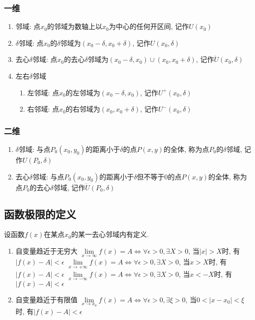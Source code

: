 \subsubsection{一维}
\begin{enumerate}
    \item 邻域: 点$ x_{0} $的邻域为数轴上以$ x_{0} $为中心的任何开区间, 记作$ U(x_{0}) $
    \item $ \delta $邻域: 点$ x_{0} $的$ \delta $邻域为$ (x_{0}-\delta,x_{0}+\delta) $, 记作$ U(x_{0},\delta) $
    \item 去心$ \delta $邻域: 点$ x_{0} $的去心$ \delta $邻域为$ (x_{0}-\delta,x_{0})\cup (x_{0},x_{0}+\delta) $, 记作$ \mathring{U}(x_{0},\delta) $
    \item 左右$ \delta $邻域
          \begin{enumerate}
              \item 左邻域: 点$ x_{0} $的左邻域为$ (x_{0}-\delta,x_{0}) $, 记作$ U^{+}(x_{0},\delta) $
              \item 右邻域: 点$ x_{0} $的右邻域为$ (x_{0},x_{0}+\delta) $, 记作$ U^{-}(x_{0},\delta) $
          \end{enumerate}
\end{enumerate}
\subsubsection{二维}
\begin{enumerate}
    \item $ \delta $邻域: 与点$ P_{0}(x_{0},y_{0}) $的距离小于$ \delta $的点$ P(x,y) $的全体, 称为点$ P_{0} $的$ \delta $邻域, 记作$ U(P_{0},\delta) $
    \item 去心$ \delta $邻域: 与点$ P_{0}(x_{0},y_{0}) $的距离小于$ \delta $但不等于0的点$ P(x,y) $的全体, 称为点$ P_{0} $的去心$ \delta $邻域, 记作$ \mathring{U}(P_{0},\delta) $
\end{enumerate}
\subsection{函数极限的定义}
设函数$ f(x) $在某点$ x_{0} $的某一去心邻域内有定义.
\begin{enumerate}
    \item 自变量趋近于无穷大
          \subitem $ \lim\limits_{x\rightarrow \infty}f(x)=A\Leftrightarrow \forall \epsilon >0, \exists X>0 $, 当$ |x|>X $时, 有$ |f(x)-A|<\epsilon $
          \subitem $ \lim\limits_{x\rightarrow +\infty}f(x)=A\Leftrightarrow \forall \epsilon >0, \exists X>0 $, 当$ x>X $时, 有$ |f(x)-A|<\epsilon $
          \subitem $ \lim\limits_{x\rightarrow -\infty}f(x)=A\Leftrightarrow \forall \epsilon >0, \exists X>0 $, 当$ x<-X $时, 有$ |f(x)-A|<\epsilon $
    \item 自变量趋近于有限值
          \subitem $ \lim\limits_{x\rightarrow x_{0}}f(x)=A\Leftrightarrow \forall \epsilon >0, \exists \xi>0 $, 当$ 0<|x-x_{0}|<\xi $时, 有$ |f(x)-A|<\epsilon $
\end{enumerate}

